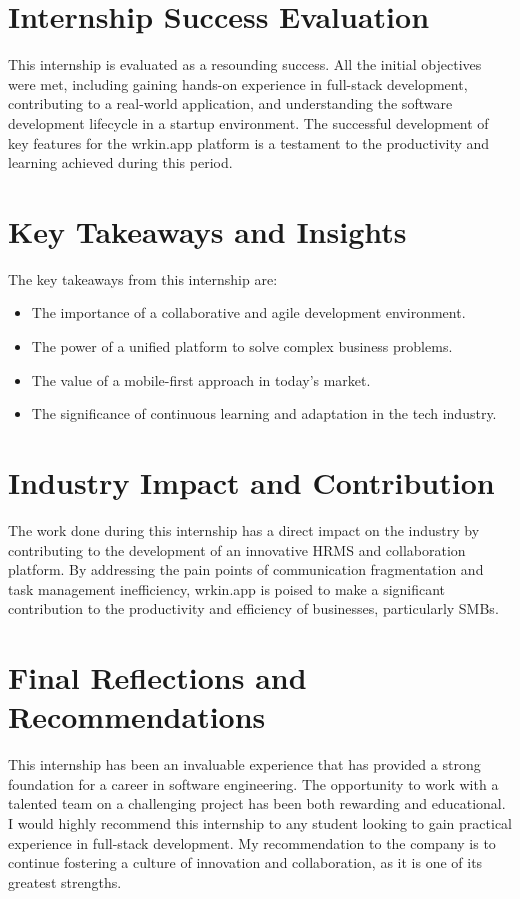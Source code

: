\section{Internship Success Evaluation}
This internship is evaluated as a resounding success. All the initial objectives were met, including gaining hands-on experience in full-stack development, contributing to a real-world application, and understanding the software development lifecycle in a startup environment. The successful development of key features for the wrkin.app platform is a testament to the productivity and learning achieved during this period.

\section{Key Takeaways and Insights}
The key takeaways from this internship are:
\begin{itemize}
    \item The importance of a collaborative and agile development environment.
    \item The power of a unified platform to solve complex business problems.
    \item The value of a mobile-first approach in today's market.
    \item The significance of continuous learning and adaptation in the tech industry.
\end{itemize}

\section{Industry Impact and Contribution}
The work done during this internship has a direct impact on the industry by contributing to the development of an innovative HRMS and collaboration platform. By addressing the pain points of communication fragmentation and task management inefficiency, wrkin.app is poised to make a significant contribution to the productivity and efficiency of businesses, particularly SMBs.

\section{Final Reflections and Recommendations}
This internship has been an invaluable experience that has provided a strong foundation for a career in software engineering. The opportunity to work with a talented team on a challenging project has been both rewarding and educational. I would highly recommend this internship to any student looking to gain practical experience in full-stack development. My recommendation to the company is to continue fostering a culture of innovation and collaboration, as it is one of its greatest strengths.